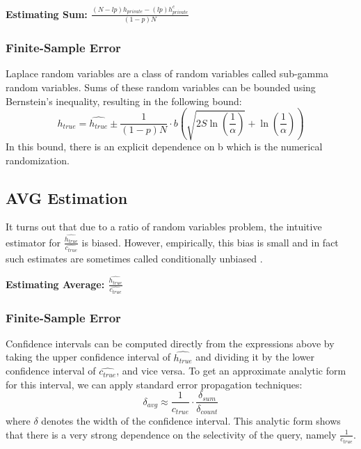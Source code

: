 \vspace{0.5em}

\noindent\textbf{Estimating Sum: \textmd{$\frac{(N-lp)h_{private}-(lp)h_{private}^{c}}{(1-p)N}$}}

\subsubsection{Finite-Sample Error}
Laplace random variables are a class of random variables called sub-gamma random variables.
Sums of these random variables can be bounded using Bernstein's inequality, resulting in the following bound:
\[
h_{true}=\widehat{h_{true}}\pm\frac{1}{(1-p)N}\cdot b(\sqrt{2S\ln(\frac{1}{\alpha})}+\ln(\frac{1}{\alpha}))
\]
In this bound, there is an explicit dependence on b which is the numerical randomization.

\subsection{AVG Estimation}
It turns out that due to a ratio of random variables problem, the intuitive estimator for \avgfunc $\frac{\widehat{h_{true}}}{\widehat{c_{true}}}$ is biased.
However, empirically, this bias is small and in fact such estimates are sometimes called conditionally unbiased \cite{DBLP:conf/sigmod/HellersteinHW97}.

\vspace{0.5em}

\noindent\textbf{Estimating Average: \textmd{$\frac{\widehat{h_{true}}}{\widehat{c_{true}}}$}}

\vspace{0.5em}

\subsubsection{Finite-Sample Error}
Confidence intervals can be computed directly from the expressions above by taking the upper confidence interval of $\widehat{h_{true}}$ and dividing it by the lower confidence interval of $\widehat{c_{true}}$, and vice versa.
To get an approximate analytic form for this interval, we can apply standard error propagation techniques:
\[
\delta_{avg} \approx \frac{1}{c_{true}} \cdot  \frac{\delta_{sum}}{\delta_{count}}
\]
where $\delta$ denotes the width of the confidence interval.
This analytic form shows that there is a very strong dependence on the selectivity of the query, namely $\frac{1}{c_{true}}$.

